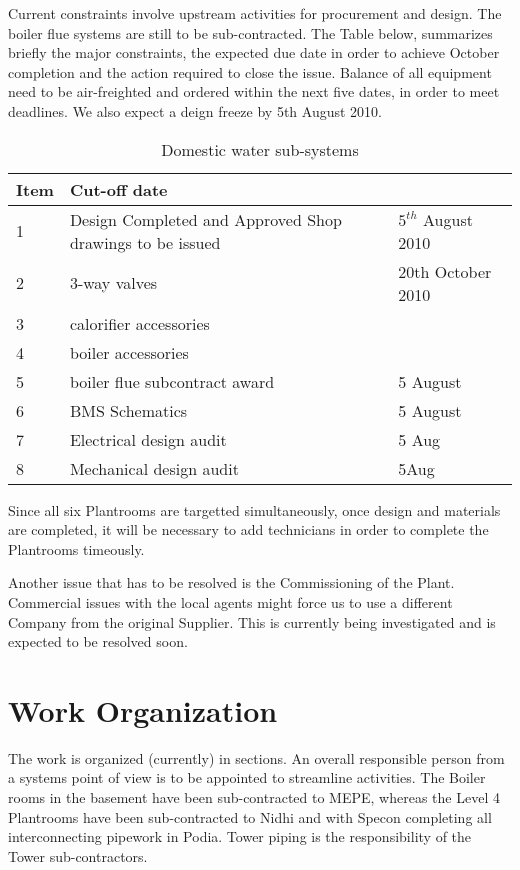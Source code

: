 Current constraints involve upstream activities for procurement and design. The boiler flue systems are still to be sub-contracted. The Table below, summarizes briefly the major constraints, the expected due date in order to achieve October completion and the action required to close the issue. Balance of all equipment need to be air-freighted and ordered within the next five dates, in order to meet deadlines. We also expect a deign freeze by 5th August 2010.


           \begin{table}[htbp] 
	    \begin{tabular}{l p{4cm}l}
	      \toprule
	     Item & Cut-off date  \\
	      \midrule
	      1  &Design Completed and Approved Shop drawings to be issued             &  $5^{th}$ August 2010  \\
 	      2  &3-way valves       &  20th October 2010  \\
                  3  &calorifier accessories & \\
                  4  &boiler accessories      & \\
                  5  &boiler flue subcontract award & 5 August\\
                  6  &BMS Schematics & 5 August \\
                  7 &Electrical design audit & 5 Aug\\
                  8 &Mechanical design audit &5Aug \\
	      \bottomrule
	    \end{tabular}
           \caption{Domestic water sub-systems}
            \end{table}

Since all six Plantrooms are targetted simultaneously, once design and materials are completed, it will be necessary to add technicians in order to complete the Plantrooms timeously.

Another issue that has to be resolved is the Commissioning of the Plant. Commercial issues with the local agents might force us to use a different Company from the original Supplier. This is currently being investigated and is expected to be resolved soon.

\section{Work Organization}
The work is organized (currently) in sections. An overall responsible person from a systems point of view is to be appointed to streamline activities. The Boiler rooms in the basement have been sub-contracted to MEPE, whereas the Level 4 Plantrooms have been sub-contracted to Nidhi and with Specon completing all interconnecting pipework in Podia. Tower piping is the responsibility of the Tower sub-contractors.


